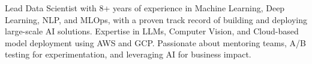 

\begin{cvparagraph}

Lead Data Scientist with 8+ years of experience in Machine Learning, Deep Learning, NLP, and MLOps, with a proven track record of building and deploying large-scale AI solutions. Expertise in LLMs, Computer Vision, and Cloud-based model deployment using AWS and GCP. Passionate about mentoring teams, A/B testing for experimentation, and leveraging AI for business impact.
\end{cvparagraph}
